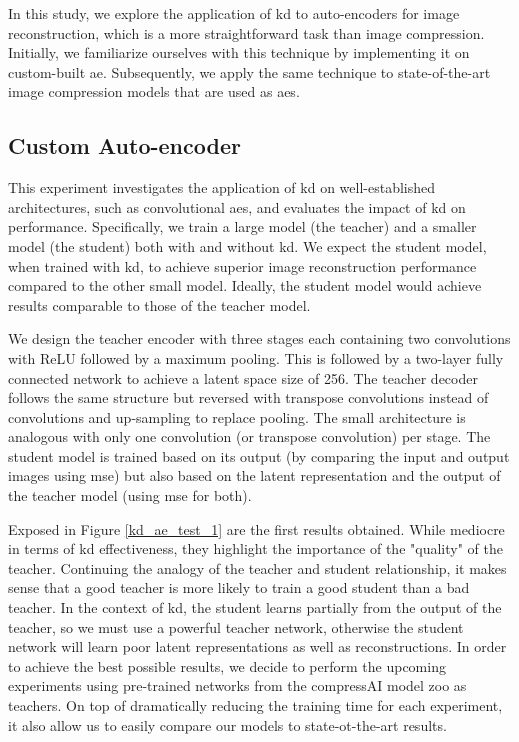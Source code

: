 In this study, we explore the application of \acrshort{kd} to auto-encoders for image reconstruction, which is a more straightforward task than image compression. Initially, we familiarize ourselves with this technique by implementing it on custom-built \acrfull{ae}. Subsequently, we apply the same technique to state-of-the-art image compression models that are used as \acrshort{ae}s.

\subsection{Custom Auto-encoder}
This experiment investigates the application of \acrshort{kd} on well-established architectures, such as convolutional \acrshort{ae}s, and evaluates the impact of \acrshort{kd} on performance. Specifically, we train a large model (the teacher) and a smaller model (the student) both with and without \acrshort{kd}. We expect the student model, when trained with \acrshort{kd}, to achieve superior image reconstruction performance compared to the other small model. Ideally, the student model would achieve results comparable to those of the teacher model.

We design the teacher encoder with three stages each containing two convolutions with ReLU followed by a maximum pooling. This is followed by a two-layer fully connected network to achieve a latent space size of 256. The teacher decoder follows the same structure but reversed with transpose convolutions instead of convolutions and up-sampling to replace pooling. The small architecture is analogous with only one convolution (or transpose convolution) per stage. The student model is trained based on its output (by comparing the input and output images using \acrshort{mse}) but also based on the latent representation and the output of the teacher model (using \acrshort{mse} for both).

Exposed in Figure \ref{kd_ae_test_1} are the first results obtained. While mediocre in terms of \acrshort{kd} effectiveness, they highlight the importance of the "quality" of the teacher. Continuing the analogy of the teacher and student relationship, it makes sense that a good teacher is more likely to train a good student than a bad teacher. In the context of \acrshort{kd}, the student learns partially from the output of the teacher, so we must use a powerful teacher network, otherwise the student network will learn poor latent representations as well as reconstructions. In order to achieve the best possible results, we decide to perform the upcoming experiments using pre-trained networks from the compressAI model zoo as teachers. On top of dramatically reducing the training time for each experiment, it also allow us to easily compare our models to state-ot-the-art results.

